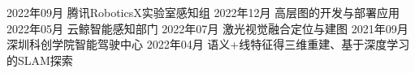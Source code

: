 %
%


 
\begin{experiences}
			
 \experience
    {2022年09月}   {}{腾讯}{RoboticsX实验室感知组}
    {2022年12月} {高层图的开发与部署应用}{}
  \experience
  {2022年05月}   {}{云鲸智能}{感知部门}
  {2022年07月} {激光视觉融合定位与建图}{}
  \experience
  {2021年09月}   {}{深圳科创学院}{智能驾驶中心}
  {2022年04月} {语义+线特征得三维重建、基于深度学习的SLAM探索}{}
\end{experiences}
